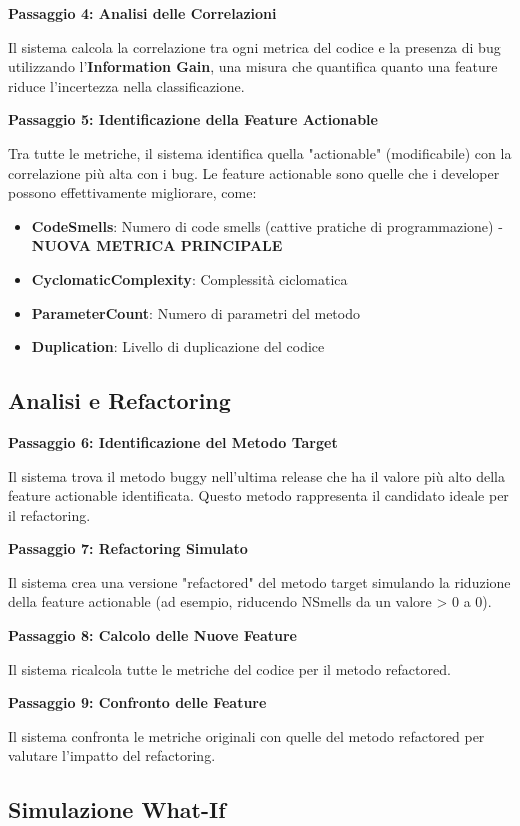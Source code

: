 \documentclass[12pt,a4paper]{article}
\begin{document}
\textbf{Passaggio 4: Analisi delle Correlazioni}

Il sistema calcola la correlazione tra ogni metrica del codice e la presenza di bug utilizzando l'\textbf{Information Gain}, una misura che quantifica quanto una feature riduce l'incertezza nella classificazione.

\textbf{Passaggio 5: Identificazione della Feature Actionable}

Tra tutte le metriche, il sistema identifica quella "actionable" (modificabile) con la correlazione più alta con i bug. Le feature actionable sono quelle che i developer possono effettivamente migliorare, come:
\begin{itemize}
    \item \textbf{CodeSmells}: Numero di code smells (cattive pratiche di programmazione) - \textbf{NUOVA METRICA PRINCIPALE}
    \item \textbf{CyclomaticComplexity}: Complessità ciclomatica
    \item \textbf{ParameterCount}: Numero di parametri del metodo
    \item \textbf{Duplication}: Livello di duplicazione del codice
\end{itemize}

\subsection{Analisi e Refactoring}

\textbf{Passaggio 6: Identificazione del Metodo Target}

Il sistema trova il metodo buggy nell'ultima release che ha il valore più alto della feature actionable identificata. Questo metodo rappresenta il candidato ideale per il refactoring.

\textbf{Passaggio 7: Refactoring Simulato}

Il sistema crea una versione "refactored" del metodo target simulando la riduzione della feature actionable (ad esempio, riducendo NSmells da un valore > 0 a 0).

\textbf{Passaggio 8: Calcolo delle Nuove Feature}

Il sistema ricalcola tutte le metriche del codice per il metodo refactored.

\textbf{Passaggio 9: Confronto delle Feature}

Il sistema confronta le metriche originali con quelle del metodo refactored per valutare l'impatto del refactoring.

\subsection{Simulazione What-If}
\end{document}
